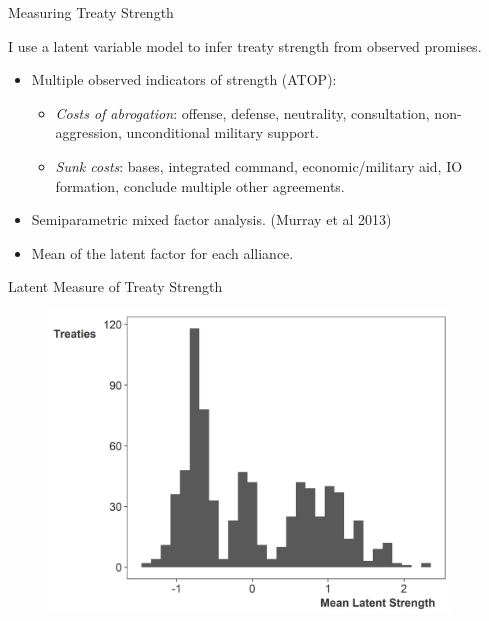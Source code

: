 \documentclass{beamer}
\begin{document}

\begin{frame}{Measuring Treaty Strength}

I use a latent variable model to infer treaty strength from observed promises. 

\pause 
\begin{itemize}
\item Multiple observed indicators of strength (ATOP): 
\begin{itemize} 
\item \textit{Costs of abrogation}: offense, defense, neutrality, consultation, non-aggression, unconditional military support.
\item \textit{Sunk costs}: bases, integrated command, economic/military aid, IO formation, conclude multiple other agreements. 
\end{itemize} 
\pause 
\item Semiparametric mixed factor analysis. (Murray et al 2013)
\pause
\item Mean of the latent factor for each alliance. 
\end{itemize} 


\end{frame} 


\begin{frame}{Latent Measure of Treaty Strength}

\begin{figure}[htbp]
	\centering
		\includegraphics[width=0.95\textwidth]{ls-hist.png}
\end{figure}


\end{frame} 
\end{document}

